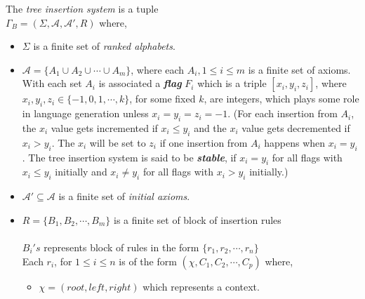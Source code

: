 \begin{definition}

The \emph{tree insertion system} is a tuple
\\ $\Gamma_B = (\Sigma,\mathcal{A},\mathcal{A} ',R)$ where,
\begin{itemize}
    \item $\Sigma$ is a finite set of \emph{ranked alphabets}.
    \item $\mathcal{A} = \{A_1\cup A_2\cup \cdots \cup A_m\}$, where each $A_i, 1\leq i\leq m$ is a finite set of axioms.\\
	With each set $A_i$ is associated  a \emph{\textbf{flag}} $F_i$ which is a triple $[x_i,y_i,z_i]$, 
	where $x_i,y_i,z_i\in\{-1,0,1,\cdots ,k\}$, for some fixed $k$, are integers,  
	which plays some role in language generation 
   	 unless $x_i=y_i=z_i=-1$. (For each insertion from $A_i$, the $x_i$ value gets incremented if $x_i\leq y_i$ and 
   	 the $x_i$ value gets decremented if $x_i>y_i$. The $x_i$ will be set to $z_i$ if one insertion from $A_i$ 
   	 happens when $x_i=y_i$. The tree insertion system is said to be \emph{\textbf{stable}}, if $x_i=y_i$ for all flags with 
   	 $x_i\leq y_i$ initially and $x_i\neq y_i$ for all flags with $x_i>y_i$ initially.)
    \item $\mathcal{A} '\subseteq \mathcal{A}$ is a finite set of \emph{initial axioms}.
    \item $R=\{B_1,B_2,\cdots,B_m\}$ is a finite set of block of insertion rules\\\\
		$B_i's$ represents block of rules in the form $\{r_1,r_2,\cdots ,r_n\}$ \\
   		 Each $r_i$, for $1\leq i\leq n$ is of the form $(\chi, C_1,C_2,\cdots ,C_p)$ where, 

   	 \begin{itemize}    
        	 \item $\chi = (root,left,right)$ which represents a context.
	
       			 \begin{itemize}   
 

\end{itemize}
\end{itemize}
\end{itemize}
\end{definition}

